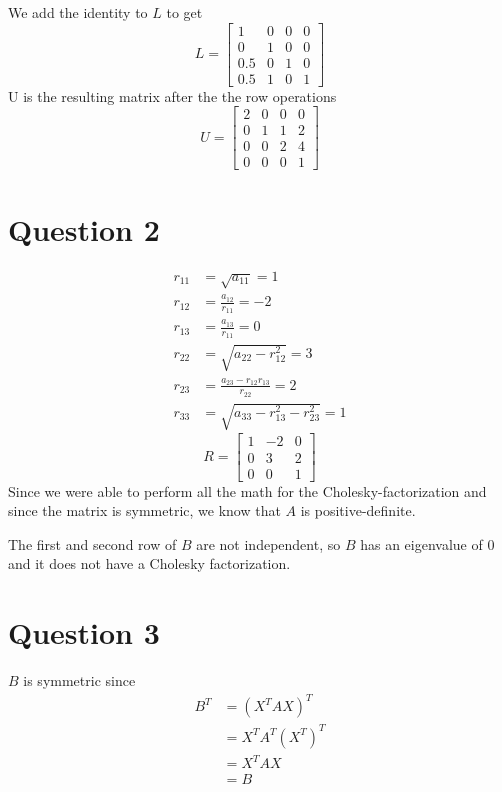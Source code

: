 \documentclass{article}
\begin{document}
We add the identity to $L$ to get
\[
    L = \begin{bmatrix}
        1 & 0 & 0 & 0 \\
        0 & 1 & 0 & 0 \\
        0.5 & 0 & 1 & 0 \\
        0.5 & 1 & 0 & 1
    \end{bmatrix}
\]
U is the resulting matrix after the the row operations 
\[
    U = \begin{bmatrix}
        2 & 0 & 0 & 0 \\
        0 & 1 & 1 & 2 \\
        0 & 0 & 2 & 4 \\
        0 & 0 & 0 & 1
    \end{bmatrix}
\]
\newpage 
\section*{Question 2}
\begin{align*}
    r_{11} &= \sqrt{a_{11}} = 1 \\
    r_{12} &= \frac{a_{12}}{r_{11}} = -2 \\
    r_{13} &= \frac{a_{13}}{r_{11}} = 0 \\
    r_{22} &= \sqrt{a_{22}-r_{12}^2} = 3 \\
    r_{23} &= \frac{a_{23} - r_{12}r_{13}}{r_{22}} = 2\\
    r_{33} &= \sqrt{a_{33} - r_{13}^2 - r_{23}^2} = 1
\end{align*}
\[
    R = \begin{bmatrix}
        1 & -2 & 0 \\
        0 & 3 & 2 \\
        0 & 0 & 1
    \end{bmatrix}
\]
Since we were able to perform all the math for the Cholesky-factorization 
and since the matrix is symmetric, we know that $A$ is positive-definite.

The first and second row of $B$ are not independent, so 
$B$ has an eigenvalue of 0 and it does not 
have a Cholesky factorization.
\newpage 

\section*{Question 3}
$B$ is symmetric since 
\begin{align*}
    B^T &= (X^TAX)^T \\
    &= X^TA^T(X^T)^T \\
    &= X^TAX \\
    &= B
\end{align*}
\end{document}
